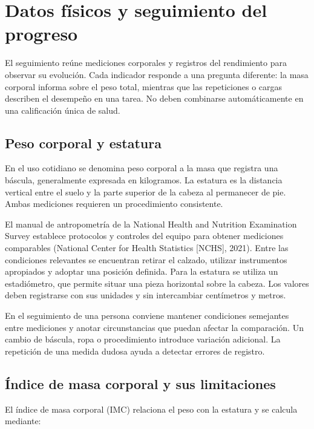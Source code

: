 \section{Datos físicos y seguimiento del progreso}
\label{sec:datos-fisicos}

El seguimiento reúne mediciones corporales y registros del rendimiento para observar su evolución. Cada indicador responde a una pregunta diferente: la masa corporal informa sobre el peso total, mientras que las repeticiones o cargas describen el desempeño en una tarea. No deben combinarse automáticamente en una calificación única de salud.

\subsection{Peso corporal y estatura}

En el uso cotidiano se denomina peso corporal a la masa que registra una báscula, generalmente expresada en kilogramos. La estatura es la distancia vertical entre el suelo y la parte superior de la cabeza al permanecer de pie. Ambas mediciones requieren un procedimiento consistente.

El manual de antropometría de la National Health and Nutrition Examination Survey establece protocolos y controles del equipo para obtener mediciones comparables (National Center for Health Statistics [NCHS], 2021). Entre las condiciones relevantes se encuentran retirar el calzado, utilizar instrumentos apropiados y adoptar una posición definida. Para la estatura se utiliza un estadiómetro, que permite situar una pieza horizontal sobre la cabeza. Los valores deben registrarse con sus unidades y sin intercambiar centímetros y metros.

En el seguimiento de una persona conviene mantener condiciones semejantes entre mediciones y anotar circunstancias que puedan afectar la comparación. Un cambio de báscula, ropa o procedimiento introduce variación adicional. La repetición de una medida dudosa ayuda a detectar errores de registro.

\subsection{Índice de masa corporal y sus limitaciones}

El índice de masa corporal (IMC) relaciona el peso con la estatura y se calcula mediante:

